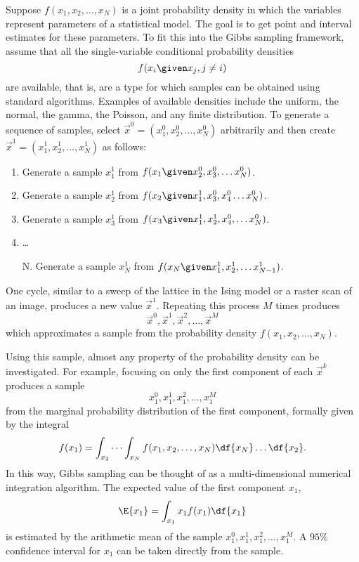 \documentclass[12pt]{article}
\begin{document}
Suppose \( f(x_1, x_2, \dots, x_N) \) is a joint probability density in
which the variables represent parameters of a statistical model.  The
goal is to get point and interval estimates for these parameters.  To
fit this into the Gibbs sampling framework, assume that all the
single-variable conditional probability densities
\[
    f(x_i \given x_j, j \ne i)
\] are available, that is, are a type for which samples can be obtained
using standard algorithms.  Examples of available densities include the
uniform, the normal, the gamma, the Poisson, and any finite
distribution.  To generate a sequence of samples, select \(
\overrightarrow{x}^0 = (x_1^0, x_2^0, \dots, x_N^0) \) arbitrarily and
then create \( \overrightarrow{x}^1 = (x_1^1, x_2^1, \dots, x_N^1) \) as
follows:
\begin{enumerate}
    \item
        Generate a sample \( x_1^1 \) from \( f(x_1 \given x_2^0, x_3^0,
        \dots x_N^0) \).
    \item
        Generate a sample \( x_2^1 \) from \( f(x_2 \given x_1^1, x_3^0,x_4^
        {0} \dots x_N^0) \).
    \item
        Generate a sample \( x_3^1 \) from \( f(x_3 \given x_1^1, x_2^1,
        x_4^0, \dots x_N^0) \).
    \item
        \dots
    \item[N.]
        Generate a sample \( x_N^1 \) from \( f(x_N \given x_1^1, x_2^1,
        \dots x_{N-1}^1) \).
\end{enumerate}
One cycle, similar to a sweep of the lattice in the Ising model or a
raster scan of an image, produces a new value \( \overrightarrow{x}^1 \).
Repeating this process \( M \) times produces
\[
    \overrightarrow{x}^0, \overrightarrow{x}^1, \overrightarrow{x}^2,
    \dots, \overrightarrow{x}^M
\] which approximates a sample from the probability density \( f(x_1, x_2,
\dots, x_N) \).

Using this sample, almost any property of the probability density can be
investigated.  For example, focusing on only the first component of each
\( \overrightarrow{x}^k \) produces a sample
\[
    x_1^0, x_1^1, x_1^2,\dots, x_1^M
\] from the marginal probability distribution of the first component,
formally given by the integral
\[
    f(x_1) = \int_{x_2}\cdots \int_{x_N} f(x_1, x_2, \dots, x_N) \df{x_N}
    \dots \df{x_2}.
\] In this way, Gibbs sampling can be thought of as a multi-dimensional
numerical integration algorithm.  The expected value of the first
component \( x_1 \),
\[
    \E{x_1} = \int_{x_1} x_1 f(x_1) \df{x_1}
\] is estimated by the arithmetic mean of the sample \( x_1^0, x_1^1, x_1^2,\dots,
x_1^M \).  A \( 95\% \) confidence interval for \( x_1 \) can be taken
directly from the sample.
\end{document}
